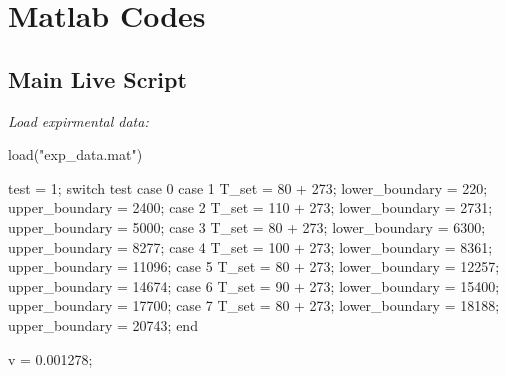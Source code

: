 \chapter{Matlab Codes}


\section{Main Live Script}
\label{T_7D74494B}

\begin{par}
\begin{flushleft}
\textit{Load expirmental data:}
\end{flushleft}
\end{par}

\begin{matlabcode}
load("exp_data.mat")
\end{matlabcode}

\label{H_B0204B1A}

\begin{par}
\hfill \break
\end{par}

\begin{matlabcode}
test = 1; %
switch test
    case 0
    case 1
        T_set = 80 + 273; %
        lower_boundary = 220; 
        upper_boundary = 2400; 
    case 2
        T_set = 110 + 273; %
        lower_boundary = 2731;
        upper_boundary = 5000;
    case 3
        T_set = 80 + 273; %
        lower_boundary = 6300;
        upper_boundary = 8277;
    case 4
        T_set = 100 + 273; %
        lower_boundary = 8361;
        upper_boundary = 11096;
    case 5
        T_set = 80 + 273; %
        lower_boundary = 12257;
        upper_boundary = 14674;
    case 6
        T_set = 90 + 273; %
        lower_boundary = 15400;
        upper_boundary = 17700;
    case 7
        T_set = 80 + 273; %
        lower_boundary = 18188;
        upper_boundary = 20743;
end
\end{matlabcode}

\label{H_68411354}

\begin{matlabcode}
v = 0.001278; %
\end{matlabcode}

\label{H_B9840D72}

